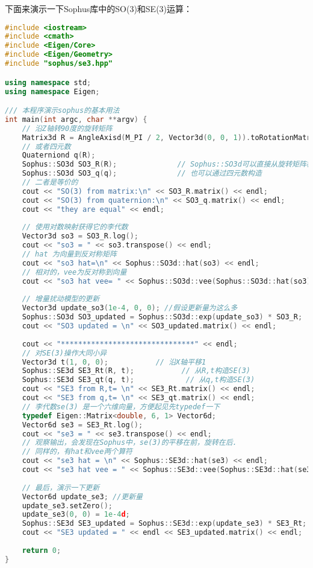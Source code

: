 下面来演示一下Sophus库中的SO(3)和SE(3)运算：

\begin{lstlisting}[language=c++,caption=slambook/ch4/useSophus.cpp]
#include <iostream>
#include <cmath>
#include <Eigen/Core>
#include <Eigen/Geometry>
#include "sophus/se3.hpp"

using namespace std;
using namespace Eigen;

/// 本程序演示sophus的基本用法
int main(int argc, char **argv) {
	// 沿Z轴转90度的旋转矩阵
	Matrix3d R = AngleAxisd(M_PI / 2, Vector3d(0, 0, 1)).toRotationMatrix();
	// 或者四元数
	Quaterniond q(R);
	Sophus::SO3d SO3_R(R);              // Sophus::SO3d可以直接从旋转矩阵构造
	Sophus::SO3d SO3_q(q);              // 也可以通过四元数构造
	// 二者是等价的
	cout << "SO(3) from matrix:\n" << SO3_R.matrix() << endl;
	cout << "SO(3) from quaternion:\n" << SO3_q.matrix() << endl;
	cout << "they are equal" << endl;
	
	// 使用对数映射获得它的李代数
	Vector3d so3 = SO3_R.log();
	cout << "so3 = " << so3.transpose() << endl;
	// hat 为向量到反对称矩阵
	cout << "so3 hat=\n" << Sophus::SO3d::hat(so3) << endl;
	// 相对的，vee为反对称到向量
	cout << "so3 hat vee= " << Sophus::SO3d::vee(Sophus::SO3d::hat(so3)).transpose() << endl;
	
	// 增量扰动模型的更新
	Vector3d update_so3(1e-4, 0, 0); //假设更新量为这么多
	Sophus::SO3d SO3_updated = Sophus::SO3d::exp(update_so3) * SO3_R;
	cout << "SO3 updated = \n" << SO3_updated.matrix() << endl;
	
	cout << "*******************************" << endl;
	// 对SE(3)操作大同小异
	Vector3d t(1, 0, 0);           // 沿X轴平移1
	Sophus::SE3d SE3_Rt(R, t);           // 从R,t构造SE(3)
	Sophus::SE3d SE3_qt(q, t);            // 从q,t构造SE(3)
	cout << "SE3 from R,t= \n" << SE3_Rt.matrix() << endl;
	cout << "SE3 from q,t= \n" << SE3_qt.matrix() << endl;
	// 李代数se(3) 是一个六维向量，方便起见先typedef一下
	typedef Eigen::Matrix<double, 6, 1> Vector6d;
	Vector6d se3 = SE3_Rt.log();
	cout << "se3 = " << se3.transpose() << endl;
	// 观察输出，会发现在Sophus中，se(3)的平移在前，旋转在后.
	// 同样的，有hat和vee两个算符
	cout << "se3 hat = \n" << Sophus::SE3d::hat(se3) << endl;
	cout << "se3 hat vee = " << Sophus::SE3d::vee(Sophus::SE3d::hat(se3)).transpose() << endl;
	
	// 最后，演示一下更新
	Vector6d update_se3; //更新量
	update_se3.setZero();
	update_se3(0, 0) = 1e-4d;
	Sophus::SE3d SE3_updated = Sophus::SE3d::exp(update_se3) * SE3_Rt;
	cout << "SE3 updated = " << endl << SE3_updated.matrix() << endl;
	
	return 0;
}
\end{lstlisting}

